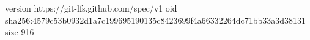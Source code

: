 version https://git-lfs.github.com/spec/v1
oid sha256:4579c53b0932d1a7c199695190135c8423699f4a66332264dc71bb33a3d38131
size 916
